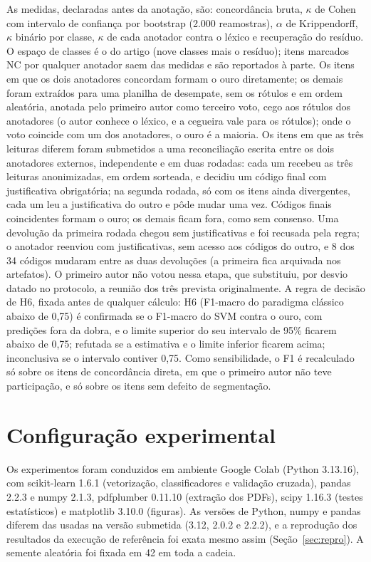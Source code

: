 \documentclass[fleqn,10pt]{SelfArx}
\begin{document}
As medidas, declaradas antes da anotação, são: concordância bruta, $\kappa$ de Cohen com intervalo de confiança por bootstrap (2.000 reamostras), $\alpha$ de Krippendorff, $\kappa$ binário por classe, $\kappa$ de cada anotador contra o léxico e recuperação do resíduo. O espaço de classes é o do artigo (nove classes mais o resíduo); itens marcados NC por qualquer anotador saem das medidas e são reportados à parte. Os itens em que os dois anotadores concordam formam o ouro diretamente; os demais foram extraídos para uma planilha de desempate, sem os rótulos e em ordem aleatória, anotada pelo primeiro autor como terceiro voto, cego aos rótulos dos anotadores (o autor conhece o léxico, e a cegueira vale para os rótulos); onde o voto coincide com um dos anotadores, o ouro é a maioria. Os itens em que as três leituras diferem foram submetidos a uma reconciliação escrita entre os dois anotadores externos, independente e em duas rodadas: cada um recebeu as três leituras anonimizadas, em ordem sorteada, e decidiu um código final com justificativa obrigatória; na segunda rodada, só com os itens ainda divergentes, cada um leu a justificativa do outro e pôde mudar uma vez. Códigos finais coincidentes formam o ouro; os demais ficam fora, como sem consenso. Uma devolução da primeira rodada chegou sem justificativas e foi recusada pela regra; o anotador reenviou com justificativas, sem acesso aos códigos do outro, e 8 dos 34 códigos mudaram entre as duas devoluções (a primeira fica arquivada nos artefatos). O primeiro autor não votou nessa etapa, que substituiu, por desvio datado no protocolo, a reunião dos três prevista originalmente. A regra de decisão de H6, fixada antes de qualquer cálculo: H6 (F1-macro do paradigma clássico abaixo de 0,75) é confirmada se o F1-macro do SVM contra o ouro, com predições fora da dobra, e o limite superior do seu intervalo de 95\% ficarem abaixo de 0,75; refutada se a estimativa e o limite inferior ficarem acima; inconclusiva se o intervalo contiver 0,75. Como sensibilidade, o F1 é recalculado só sobre os itens de concordância direta, em que o primeiro autor não teve participação, e só sobre os itens sem defeito de segmentação.

\section{Configuração experimental}
\label{sec:config}

Os experimentos foram conduzidos em ambiente Google Colab (Python 3.13.16), com scikit-learn 1.6.1 \cite{pedregosa2011} (vetorização, classificadores e validação cruzada), pandas 2.2.3 e numpy 2.1.3, pdfplumber 0.11.10 (extração dos PDFs), scipy 1.16.3 (testes estatísticos) e matplotlib 3.10.0 (figuras). As versões de Python, numpy e pandas diferem das usadas na versão submetida (3.12, 2.0.2 e 2.2.2), e a reprodução dos resultados da execução de referência foi exata mesmo assim (Seção~\ref{sec:repro}). A semente aleatória foi fixada em 42 em toda a cadeia.
\end{document}
